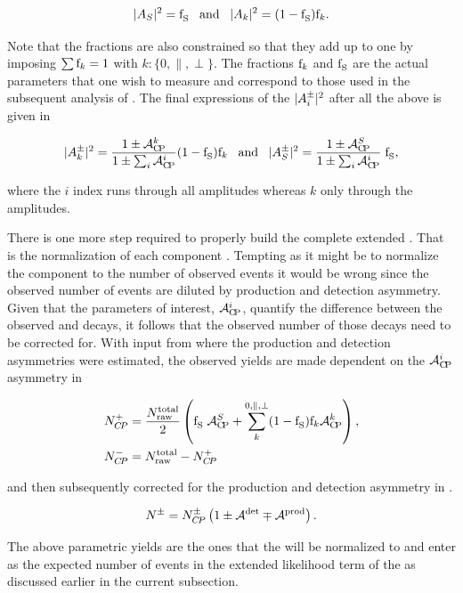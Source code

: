 \begin{equation}
|{A}_{S}|^2 = \text{f}_{\text{S}}^{} \;\;\;\text{and}\;\;\; |{A}_{k}|^2 = (1-\text{f}_{\text{S}}^{})\text{f}_{k}.
\label{amps_param}
\end{equation}

\noindent Note that the \pwave fractions are also constrained so that they add up to one by imposing $\sum\text{f}_{k}=1$ with $k:\{0,\parallel,\perp\}$.
The fractions $\text{f}_{k}$ and $\text{f}_{\text{S}}^{}$ are the actual parameters that one wish to measure and correspond to those used in the subsequent analysis of
. The final expressions of the $|{A}_{i}^{\pm}|^2$ after all the above is given in 

\begin{equation}
|{A}_{k}^{\pm}|^2 = \frac{1\pm\mathcal{A}_{\rm C\!P}^{k}}{1\pm\sum_i\mathcal{A}_{\rm C\!P}^{i}}  (1-\text{f}_{\text{S}}^{})\text{f}_{k}  \;\;\; \text{and}\;\;\; |{A}_{S}^{\pm}|^2 = \frac{1\pm\mathcal{A}_{\rm C\!P}^{S}}{1\pm\sum_i\mathcal{A}_{\rm C\!P}^{i}} \; \text{f}_{\text{S}}^{},
\label{amps_final}
\end{equation}

\noindent where the $i$ index runs through all amplitudes whereas $k$ only through the \pwave amplitudes.

There is one more step required to properly build the complete extended \pdf. That is the normalization of each component \pdf. Tempting as it might be to
normalize the component \pdfs to the number of observed events it would be wrong since the observed number of events are diluted by production and detection
asymmetry. Given that the parameters of interest, $\mathcal{A}_{\rm C\!P}^{i}$, quantify the difference between the observed \BsbarJpsiKst and \BsJpsiKst decays, it follows that
the observed  number of those decays need to be corrected for. With input from  where the production and detection
asymmetries were estimated, the observed yields are made dependent on the $\mathcal{A}_{\rm C\!P}^{i}$ asymmetry in 

\begin{subequations}
  \label{acp_yields}
  \begin{align}
    N^{+}_{C\!P} &= \frac{ N_{\text{raw}}^{\text{total}} }{2} \left( \text{f}_{\text{S}}^{}\; \mathcal{A}_{\rm C\!P}^{S} + \sum_k^{0,\parallel,\perp} (1-\text{f}_{\text{S}}^{})\text{f}_{k}\mathcal{A}_{\rm C\!P}^{k}  \right), \\
    N^{-}_{C\!P} &=  N_{\text{raw}}^{\text{total}} - N^{+}_{C\!P}
  \end{align}
\end{subequations}

\noindent and then subsequently corrected for the production and detection asymmetry in .

\begin{equation}
N^{\pm} = N^{\pm}_{C\!P}  \left( 1 \pm \mathcal{A}^{\text{det}} \mp \mathcal{A}^{\text{prod}} \right).
\label{norm_yields}
\end{equation}

\noindent The above parametric yields are the ones that the \pdfs will be normalized to and enter as the expected number of events in the extended
likelihood term of the \pdfs as discussed earlier in the current subsection.
